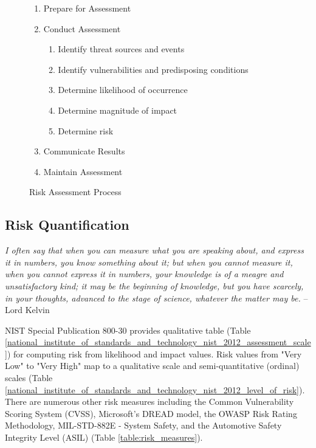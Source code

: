 \documentclass{article}
\begin{document}
\begin{figure}[h]
    \begin{enumerate}
        \item Prepare for Assessment
        \item Conduct Assessment
        \begin{enumerate}
            \item Identify threat sources and events
            \item Identify vulnerabilities and predisposing conditions
            \item Determine likelihood of occurrence
            \item Determine magnitude of impact
            \item Determine risk
        \end{enumerate}
        \item Communicate Results
        \item Maintain Assessment 
    \end{enumerate}
    \caption{Risk Assessment Process \citep{national_institute_of_standards_and_technology_nist_2012}}
\label{figure:national_institute_of_standards_and_technology_nist_2012}
\end{figure}

\newpage
\subsection{Risk Quantification}

\begin{mdframed}
    \emph{I often say that when you can measure what you are speaking about, and express it in numbers, you know something about it; but when you cannot measure it, when you cannot express it in numbers, your knowledge is of a meagre and unsatisfactory kind; it may be the beginning of knowledge, but you have scarcely, in your thoughts, advanced to the stage of science, whatever the matter may be.} -- Lord Kelvin \citep{thomson_1st_baron_kelvin_electrical_1883}
\end{mdframed}

\noindent NIST Special Publication 800-30 provides qualitative table (Table \ref{national_institute_of_standards_and_technology_nist_2012_assessment_scale}) for computing risk from likelihood and impact values. Risk values from "Very Low" to "Very High" map to a qualitative scale and semi-quantitative (ordinal) scales  (Table \ref{national_institute_of_standards_and_technology_nist_2012_level_of_risk}). There are numerous other risk measures including the Common Vulnerability Scoring System (CVSS), Microsoft's DREAD model, the OWASP Risk Rating Methodology, MIL-STD-882E - System Safety, and the Automotive Safety Integrity Level (ASIL) (Table \ref{table:risk_measures}).
\end{document}
